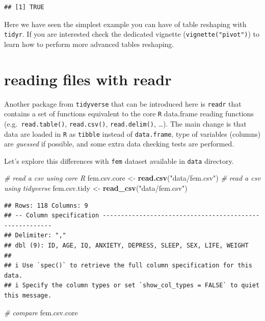 \documentclass[
]{book}
\newenvironment{Shaded}{\begin{snugshade}}{\end{snugshade}}
\newcommand{\CommentTok}[1]{\textcolor[rgb]{0.56,0.35,0.01}{\textit{#1}}}
\newcommand{\FunctionTok}[1]{\textcolor[rgb]{0.13,0.29,0.53}{\textbf{#1}}}
\newcommand{\NormalTok}[1]{#1}
\newcommand{\OtherTok}[1]{\textcolor[rgb]{0.56,0.35,0.01}{#1}}
\newcommand{\StringTok}[1]{\textcolor[rgb]{0.31,0.60,0.02}{#1}}
\begin{document}
\begin{verbatim}
## [1] TRUE
\end{verbatim}

Here we have seen the simplest example you can have of table reshaping with \texttt{tidyr}. If you are interested check the dedicated vignette (\texttt{vignette("pivot")}) to learn how to perform more advanced tables reshaping.

\section{reading files with readr}\label{reading-files-with-readr}

Another package from \texttt{tidyverse} that can be introduced here is \texttt{readr} that contains a set of functions equivalent to the core \texttt{R} data.frame reading functions (e.g.~\texttt{read.table()}, \texttt{read.csv()}, \texttt{read.delim()}, \ldots). The main change is that data are loaded in \texttt{R} as \texttt{tibble} instead of \texttt{data.frame}, type of variables (columns) are \emph{guessed} if possible, and some extra data checking tests are performed.

Let's explore this differences with \texttt{fem} dataset available in \texttt{data} directory.

\begin{Shaded}
\begin{Highlighting}[]
\CommentTok{\# read a csv using core R}
\NormalTok{fem.csv.core }\OtherTok{\textless{}{-}} \FunctionTok{read.csv}\NormalTok{(}\StringTok{"data/fem.csv"}\NormalTok{)}
\CommentTok{\# read a csv using tidyverse}
\NormalTok{fem.csv.tidy }\OtherTok{\textless{}{-}} \FunctionTok{read\_csv}\NormalTok{(}\StringTok{"data/fem.csv"}\NormalTok{)}
\end{Highlighting}
\end{Shaded}

\begin{verbatim}
## Rows: 118 Columns: 9
## -- Column specification --------------------------------------------------------
## Delimiter: ","
## dbl (9): ID, AGE, IQ, ANXIETY, DEPRESS, SLEEP, SEX, LIFE, WEIGHT
## 
## i Use `spec()` to retrieve the full column specification for this data.
## i Specify the column types or set `show_col_types = FALSE` to quiet this message.
\end{verbatim}

\begin{Shaded}
\begin{Highlighting}[]
\CommentTok{\# compare}
\NormalTok{fem.csv.core}
\end{Highlighting}
\end{Shaded}
\end{document}
